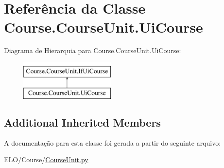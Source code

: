 \hypertarget{classCourse_1_1CourseUnit_1_1UiCourse}{\section{Referência da Classe Course.\-Course\-Unit.\-Ui\-Course}
\label{classCourse_1_1CourseUnit_1_1UiCourse}
}
Diagrama de Hierarquia para Course.\-Course\-Unit.\-Ui\-Course\-:\begin{figure}[H]
\begin{center}
\leavevmode
\includegraphics[height=2.000000cm]{d1/dbb/classCourse_1_1CourseUnit_1_1UiCourse}
\end{center}
\end{figure}
\subsection*{Additional Inherited Members}


A documentação para esta classe foi gerada a partir do seguinte arquivo\-:\begin{DoxyCompactItemize}
\item 
E\-L\-O/\-Course/\hyperlink{CourseUnit_8py}{Course\-Unit.\-py}\end{DoxyCompactItemize}
